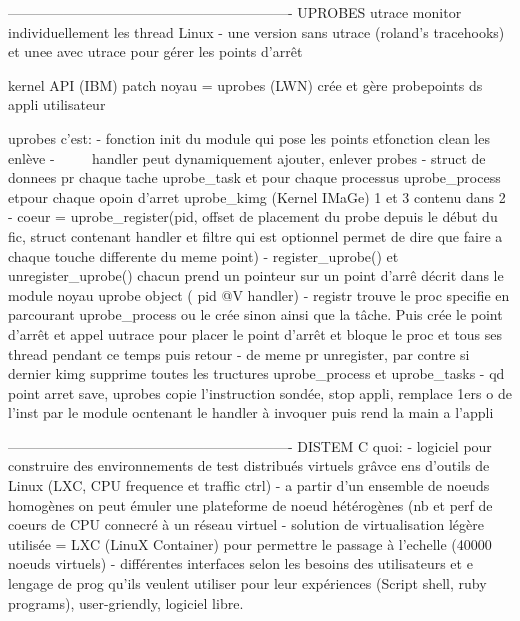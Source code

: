 -------------------------------------------------------------
UPROBES
utrace monitor individuellement les thread Linux
- une version sans utrace (roland's tracehooks) et unee avec utrace pour gérer les points d'arrêt 

kernel API (IBM) patch noyau = uprobes (LWN)
crée et gère probepoints ds appli utilisateur

uprobes c'est:
- fonction init du module qui pose les points etfonction clean les enlève
- ~~~~ handler peut dynamiquement ajouter, enlever probes
- struct de donnees pr chaque tache uprobe_task et pour chaque processus uprobe_process etpour chaque opoin d'arret uprobe_kimg (Kernel IMaGe) 1 et 3 contenu dans 2
- coeur = uprobe_register(pid, offset de placement du probe depuis le début du fic, struct contenant handler et filtre qui est optionnel permet de dire que faire a chaque touche differente du meme point)
- register_uprobe() et unregister_uprobe() chacun prend un pointeur sur un point d'arrê décrit dans le module noyau uprobe object ( pid @V handler)
- registr trouve le proc specifie en parcourant uprobe_process ou le crée sinon ainsi que la tâche. Puis crée le point d'arrêt et appel uutrace pour placer le point d'arrêt  et bloque le proc et tous ses thread pendant ce temps puis retour
- de meme pr unregister, par contre si dernier kimg supprime toutes les tructures uprobe_process et uprobe_tasks
- qd point arret save, uprobes copie l'instruction sondée, stop appli, remplace 1ers o de l'inst par le module ocntenant le handler à invoquer puis rend la main a l'appli



-------------------------------------------------------------
DISTEM
C quoi:
- logiciel pour construire des environnements de test distribués virtuels grâvce ens d'outils de Linux (LXC, CPU frequence et traffic ctrl)
- a partir d'un ensemble de noeuds homogènes on peut émuler une plateforme de noeud hétérogènes (nb et perf de coeurs de CPU connecré à un réseau virtuel
- solution de virtualisation légère utilisée = LXC (LinuX Container) pour permettre le passage à l'echelle (40000 noeuds virtuels)
- différentes interfaces selon les besoins des utilisateurs et e lengage de prog qu'ils veulent utiliser pour leur expériences (Script shell, ruby programs), user-griendly, logiciel libre.

